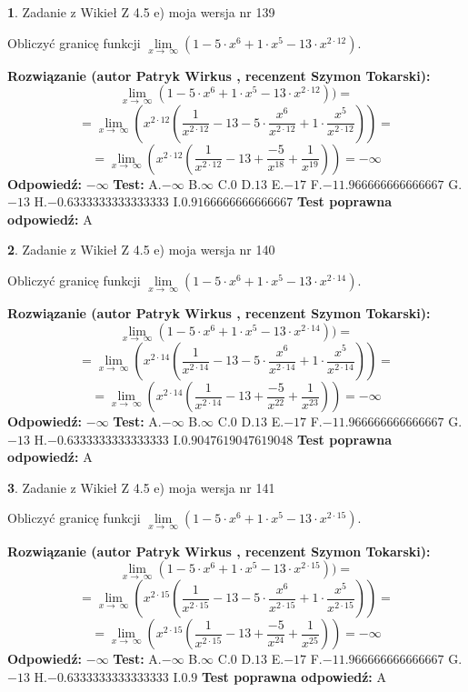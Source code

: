 \documentclass[12pt, a4paper]{article}
\theoremstyle{definition} %
\newtheorem{zad}{}
\newcommand{\zadStart}[1]{\begin{zad}#1\newline}
\newcommand{\zadStop}{\end{zad}}
\newcommand{\rozwStart}[2]{\noindent \textbf{Rozwiązanie (autor #1 , recenzent #2): }\newline}
\newcommand{\rozwStop}{\newline}
\newcommand{\odpStart}{\noindent \textbf{Odpowiedź:}\newline}
\newcommand{\odpStop}{\newline}
\newcommand{\testStart}{\noindent \textbf{Test:}\newline}
\newcommand{\testStop}{\newline}
\newcommand{\kluczStart}{\noindent \textbf{Test poprawna odpowiedź:}\newline}
\newcommand{\kluczStop}{\newline}
\begin{document}
\zadStart{Zadanie z Wikieł Z 4.5 e) moja wersja nr 139}


Obliczyć granicę funkcji  $\lim\limits_{x\to\ \infty}(1 - 5 \cdot x^{6}+1 \cdot x^{5}- 13 \cdot x^{2\cdot12})$.
\zadStop
\rozwStart{Patryk Wirkus}{Szymon Tokarski}
$$\lim\limits_{x\to\ \infty}(1 - 5 \cdot x^{6}+1 \cdot x^{5}- 13 \cdot x^{2\cdot12}))=$$
$$=\lim\limits_{x\to\ \infty}(x^{2\cdot12}(\frac{1}{x^{2\cdot12}}-13 -5 \cdot \frac{x^{6}}{x^{2\cdot12}}+1 \cdot \frac{x^{5}}{x^{2\cdot12}}))=$$
$$=\lim\limits_{x\to\ \infty}(x^{2\cdot12}(\frac{1}{x^{2\cdot12}}-13 + \frac{-5}{x^{18}}+ \frac{1}{x^{19}}))=-\infty$$
\rozwStop
\odpStart
$-\infty$
\odpStop
\testStart
A.$-\infty$ B.$\infty$ C.$0$ D.$13$ E.$-17$
F.$-11.966666666666667$ G.$-13$
H.$-0.6333333333333333$
I.$0.9166666666666667$
\testStop
\kluczStart
A
\kluczStop



\zadStart{Zadanie z Wikieł Z 4.5 e) moja wersja nr 140}


Obliczyć granicę funkcji  $\lim\limits_{x\to\ \infty}(1 - 5 \cdot x^{6}+1 \cdot x^{5}- 13 \cdot x^{2\cdot14})$.
\zadStop
\rozwStart{Patryk Wirkus}{Szymon Tokarski}
$$\lim\limits_{x\to\ \infty}(1 - 5 \cdot x^{6}+1 \cdot x^{5}- 13 \cdot x^{2\cdot14}))=$$
$$=\lim\limits_{x\to\ \infty}(x^{2\cdot14}(\frac{1}{x^{2\cdot14}}-13 -5 \cdot \frac{x^{6}}{x^{2\cdot14}}+1 \cdot \frac{x^{5}}{x^{2\cdot14}}))=$$
$$=\lim\limits_{x\to\ \infty}(x^{2\cdot14}(\frac{1}{x^{2\cdot14}}-13 + \frac{-5}{x^{22}}+ \frac{1}{x^{23}}))=-\infty$$
\rozwStop
\odpStart
$-\infty$
\odpStop
\testStart
A.$-\infty$ B.$\infty$ C.$0$ D.$13$ E.$-17$
F.$-11.966666666666667$ G.$-13$
H.$-0.6333333333333333$
I.$0.9047619047619048$
\testStop
\kluczStart
A
\kluczStop



\zadStart{Zadanie z Wikieł Z 4.5 e) moja wersja nr 141}


Obliczyć granicę funkcji  $\lim\limits_{x\to\ \infty}(1 - 5 \cdot x^{6}+1 \cdot x^{5}- 13 \cdot x^{2\cdot15})$.
\zadStop
\rozwStart{Patryk Wirkus}{Szymon Tokarski}
$$\lim\limits_{x\to\ \infty}(1 - 5 \cdot x^{6}+1 \cdot x^{5}- 13 \cdot x^{2\cdot15}))=$$
$$=\lim\limits_{x\to\ \infty}(x^{2\cdot15}(\frac{1}{x^{2\cdot15}}-13 -5 \cdot \frac{x^{6}}{x^{2\cdot15}}+1 \cdot \frac{x^{5}}{x^{2\cdot15}}))=$$
$$=\lim\limits_{x\to\ \infty}(x^{2\cdot15}(\frac{1}{x^{2\cdot15}}-13 + \frac{-5}{x^{24}}+ \frac{1}{x^{25}}))=-\infty$$
\rozwStop
\odpStart
$-\infty$
\odpStop
\testStart
A.$-\infty$ B.$\infty$ C.$0$ D.$13$ E.$-17$
F.$-11.966666666666667$ G.$-13$
H.$-0.6333333333333333$
I.$0.9$
\testStop
\kluczStart
A
\kluczStop
\end{document}
